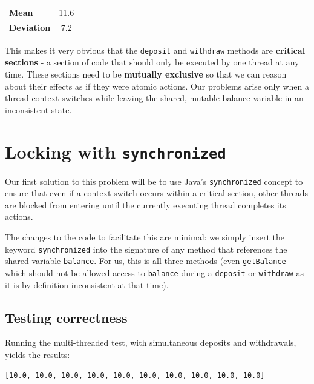 \documentclass[a4paper,12pt]{kth-mag}
\begin{document}
\begin{table}[h]
    \centering
    \begin{tabular}{lc}    
    \textbf{Mean} & 11.6 \\
    \textbf{Deviation} & 7.2 \\ 
    \end{tabular}
\end{table}

This makes it very obvious that the \texttt{deposit} and \texttt{withdraw} methods are \textbf{critical sections} - a section of code that should only be executed by one thread at any time. These sections need to be \textbf{mutually exclusive} so that we can reason about their effects as if they were atomic actions. Our problems arise only when a thread context switches while leaving the shared, mutable balance variable in an inconsistent state. 

\section{Locking with \texttt{synchronized}}

Our first solution to this problem will be to use Java's \texttt{synchronized} concept to ensure that even if a context switch occurs within a critical section, other threads are blocked from entering until the currently executing thread completes its actions.

The changes to the code to facilitate this are minimal: we simply insert the keyword \texttt{synchronized} into the signature of any method that references the shared variable \texttt{balance}. For us, this is all three methods (even \texttt{getBalance} which should not be allowed access to \texttt{balance} during a \texttt{deposit} or \texttt{withdraw} as it is by definition inconsistent at that time).

\subsection{Testing correctness}

Running the multi-threaded test, with simultaneous deposits and withdrawals, yields the results:

\begin{listing}[H]
	\begin{verbatim}
[10.0, 10.0, 10.0, 10.0, 10.0, 10.0, 10.0, 10.0, 10.0, 10.0] 
	\end{verbatim}
\end{listing}
\end{document}
